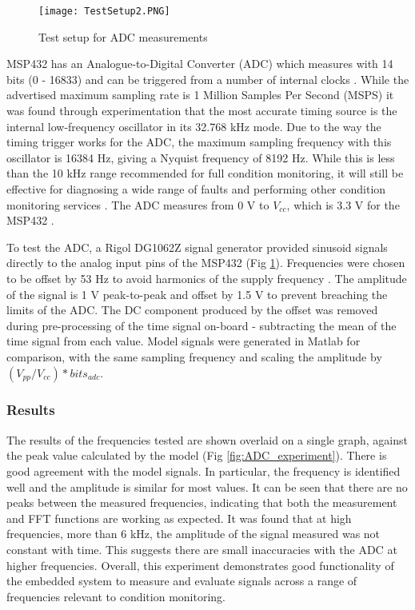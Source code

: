 \begin{figure}
    \centering
    \texttt{[image: TestSetup2.PNG]}
    \caption{Test setup for ADC measurements}
    \label{fig:ADCtest}
\end{figure}

MSP432 has an Analogue-to-Digital Converter (ADC) which measures with 14 bits (0 - 16833) and can be triggered from a number of internal clocks \cite{MSP432_Datasheet}.
While the advertised maximum sampling rate is 1 Million Samples Per Second (MSPS) it was found through experimentation that the most accurate timing source is the internal low-frequency oscillator in its 32.768 kHz mode.
Due to the way the timing trigger works for the ADC, the maximum sampling frequency with this oscillator is 16384 Hz, giving a Nyquist frequency of 8192 Hz.
While this is less than the 10 kHz range recommended for full condition monitoring, it will still be effective for diagnosing a wide range of faults and performing other condition monitoring services \cite{ISO13373-1}\cite{CBM_lr}.
The ADC measures from 0 V to $V_{cc}$, which is 3.3 V for the MSP432 \cite{MSP432_Datasheet}.
\par
To test the ADC, a Rigol DG1062Z signal generator provided sinusoid signals directly to the analog input pins of the MSP432 (Fig \ref{fig:ADCtest}).
Frequencies were chosen to be offset by 53 Hz to avoid harmonics of the supply frequency \cite{MEMS_testing}.
The amplitude of the signal is 1 V peak-to-peak and offset by 1.5 V to prevent breaching the limits of the ADC.
The DC component produced by the offset was removed during pre-processing of the time signal on-board - subtracting the mean of the time signal from each value.
Model signals were generated in Matlab for comparison, with the same sampling frequency and scaling the amplitude by $(V_{pp} / V_{cc})* bits_{adc}$.



\subsubsection{Results}

The results of the frequencies tested are shown overlaid on a single graph, against the peak value calculated by the model (Fig \ref{fig:ADC_experiment}).
There is good agreement with the model signals.
In particular, the frequency is identified well and the amplitude is similar for most values.
It can be seen that there are no peaks between the measured frequencies, indicating that both the measurement and FFT functions are working as expected.
It was found that at high frequencies, more than 6 kHz, the amplitude of the signal measured was not constant with time.
This suggests there are small inaccuracies with the ADC at higher frequencies.
Overall, this experiment demonstrates good functionality of the embedded system to measure and evaluate signals across a range of frequencies relevant to condition monitoring.



